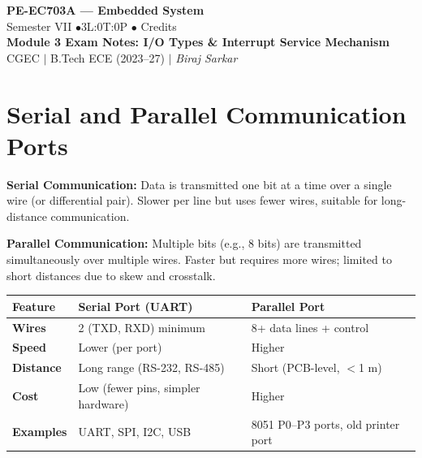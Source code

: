 \documentclass[12pt,a4paper]{article}
\renewcommand{\arraystretch}{1.45}
\begin{document}

\begin{center}
  {\LARGE\bfseries\color{myred} PE-EC703A --- Embedded System}\\[5pt]
  {\normalsize\color{mydark} Semester VII \quad$\bullet$\quad 3L:0T:0P \quad$\bullet$ Credits}\\[3pt]
  {\normalsize\color{myteal}\textbf{Module 3 Exam Notes: I/O Types \& Interrupt Service Mechanism}}\\[3pt]
  {\small\color{mydark} CGEC \;$|$\; B.Tech ECE (2023--27) \;$|$\; \textit{Biraj Sarkar}}
\end{center}
\vspace{2pt}
\noindent{\color{myred}\rule{\linewidth}{1.5pt}}
\vspace{2pt}

\hypersetup{linkcolor=mydark}
\tableofcontents
\hypersetup{linkcolor=myteal}
\newpage

\section{Serial and Parallel Communication Ports}

\begin{tcolorbox}[defbox, title={\textbf{Serial vs.\ Parallel Communication}}]
\textbf{Serial Communication:} Data is transmitted one bit at a time over a single wire (or differential pair). Slower per line but uses fewer wires, suitable for long-distance communication.

\textbf{Parallel Communication:} Multiple bits (e.g., 8 bits) are transmitted simultaneously over multiple wires. Faster but requires more wires; limited to short distances due to skew and crosstalk.
\end{tcolorbox}

\par\noindent
{\renewcommand{\arraystretch}{1.55}%
\begin{tabularx}{\linewidth}{|B{3.0cm}|Y|Y|}
\hline
\textbf{Feature} & \textbf{Serial Port (UART)} & \textbf{Parallel Port} \\
\hline
\textbf{Wires} & 2 (TXD, RXD) minimum & 8+ data lines + control \\
\hline
\textbf{Speed} & Lower (per port) & Higher \\
\hline
\textbf{Distance} & Long range (RS-232, RS-485) & Short (PCB-level, $<$1 m) \\
\hline
\textbf{Cost} & Low (fewer pins, simpler hardware) & Higher \\
\hline
\textbf{Examples} & UART, SPI, I2C, USB & 8051 P0--P3 ports, old printer port \\
\hline
\end{tabularx}}
\end{document}
